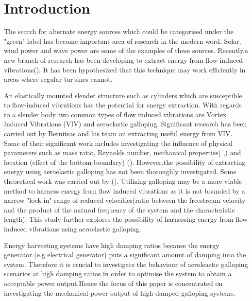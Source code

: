 \section{Introduction} 

The search for alternate energy sources which could be categorised  under the "green" label has become important area of research in the modern word. Solar, wind power and wave power are some of the examples of these sources.  Recently,a new branch of research has been developing to extract energy from flow induced vibrations(\cite{Bernitsas2008a-concept}). It has been hypothesized that this technique may work efficiently in areas where regular turbines cannot. 

An elastically mounted slender structure such as cylinders which  are susceptible to flow-induced vibrations has the potential for energy extraction. With regards to a slender body two common types of   flow induced vibrations are Vortex Induced Vibrations (VIV) and aeroelastic galloping. Significant research has been carried out by Bernitsas and his team on extracting useful energy from VIV. Some of their significant work includes investigating the influence  of physical parameters such as mass ratio, Reynolds number, mechanical properties(\cite{Raghavan2010a} ,\cite{Lee2011b}) and location (effect of the bottom boundary) (\cite{Raghavan2009}). However,the possibility of extracting energy using aeroelastic galloping has not been thoroughly investigated. Some theoretical work was carried out by (\cite{Barrero-Gil2010a}). Utilizing galloping may be a more viable method to harness energy from flow induced vibrations as it is not bounded by a narrow "lock-in" range of reduced velocities(ratio between the freestream velocity and the product of the natural frequency of the system and the characteristic length). This study further explores the possibility of harnessing energy from flow induced vibrations using aeroelastic galloping.

Energy harvesting systems have high damping ratios because the energy generator (e.g electrical generator) puts a significant amount of damping into the system. Therefore it is crucial to investigate  the behaviour of aeroleastic galloping scenarios at high damping ratios in order to optimise the system to obtain a acceptable power output.Hence the focus of this paper is concentrated on investigating the mechanical power output of high-damped galloping systems.

